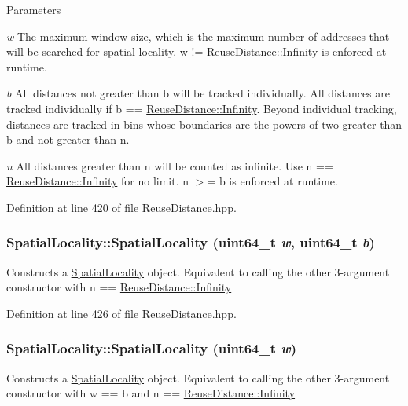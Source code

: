 \begin{DoxyParams}{Parameters}
\item[{\em w}]The maximum window size, which is the maximum number of addresses that will be searched for spatial locality. w != \hyperlink{class_reuse_distance_a59f7f0ac6ad014472537619394ac7375}{ReuseDistance::Infinity} is enforced at runtime. \item[{\em b}]All distances not greater than b will be tracked individually. All distances are tracked individually if b == \hyperlink{class_reuse_distance_a59f7f0ac6ad014472537619394ac7375}{ReuseDistance::Infinity}. Beyond individual tracking, distances are tracked in bins whose boundaries are the powers of two greater than b and not greater than n. \item[{\em n}]All distances greater than n will be counted as infinite. Use n == \hyperlink{class_reuse_distance_a59f7f0ac6ad014472537619394ac7375}{ReuseDistance::Infinity} for no limit. n $>$= b is enforced at runtime. \end{DoxyParams}


Definition at line 420 of file ReuseDistance.hpp.

\hypertarget{class_spatial_locality_a908469b7cd8a92c22a8bae4e2d4c5ade}{
\subsubsection[{SpatialLocality}]{\setlength{\rightskip}{0pt plus 5cm}SpatialLocality::SpatialLocality (uint64\_\-t {\em w}, \/  uint64\_\-t {\em b})}}
\label{class_spatial_locality_a908469b7cd8a92c22a8bae4e2d4c5ade}
Constructs a \hyperlink{class_spatial_locality}{SpatialLocality} object. Equivalent to calling the other 3-\/argument constructor with n == \hyperlink{class_reuse_distance_a59f7f0ac6ad014472537619394ac7375}{ReuseDistance::Infinity} 

Definition at line 426 of file ReuseDistance.hpp.

\hypertarget{class_spatial_locality_a63d45541023cfc370b079f1011cab5b8}{
\subsubsection[{SpatialLocality}]{\setlength{\rightskip}{0pt plus 5cm}SpatialLocality::SpatialLocality (uint64\_\-t {\em w})}}
\label{class_spatial_locality_a63d45541023cfc370b079f1011cab5b8}
Constructs a \hyperlink{class_spatial_locality}{SpatialLocality} object. Equivalent to calling the other 3-\/argument constructor with w == b and n == \hyperlink{class_reuse_distance_a59f7f0ac6ad014472537619394ac7375}{ReuseDistance::Infinity} 

